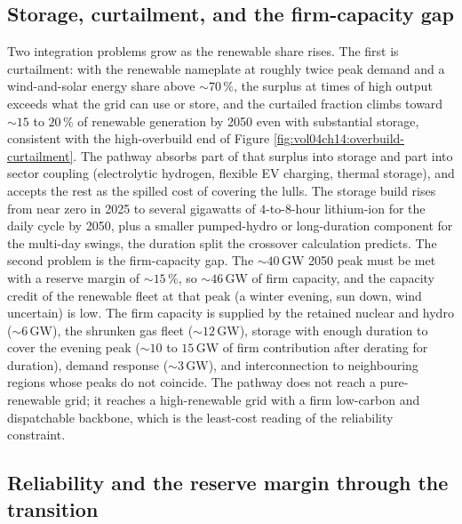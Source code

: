 \subsection{Storage, curtailment, and the firm-capacity gap}

Two integration problems grow as the renewable share rises. The first is
curtailment: with the renewable nameplate at roughly twice peak demand and
a wind-and-solar energy share above $\sim 70\,\%$, the surplus at times of
high output exceeds what the grid can use or store, and the curtailed
fraction climbs toward $\sim 15$ to $20\,\%$ of renewable generation by
2050 even with substantial storage, consistent with the high-overbuild end
of Figure \ref{fig:vol04ch14:overbuild-curtailment}. The pathway absorbs
part of that surplus into storage and part into sector coupling
(electrolytic hydrogen, flexible EV charging, thermal storage), and accepts
the rest as the spilled cost of covering the lulls. The storage build rises
from near zero in 2025 to several gigawatts of $4$-to-$8$-hour lithium-ion
for the daily cycle by 2050, plus a smaller pumped-hydro or long-duration
component for the multi-day swings, the duration split the crossover
calculation predicts. The second problem is the firm-capacity gap. The
$\sim 40\,\si{\giga\watt}$ 2050 peak must be met with a reserve margin of
$\sim 15\,\%$, so $\sim 46\,\si{\giga\watt}$ of firm capacity, and the
capacity credit of the renewable fleet at that peak (a winter evening,
sun down, wind uncertain) is low. The firm capacity is supplied by the
retained nuclear and hydro ($\sim 6\,\si{\giga\watt}$), the shrunken gas
fleet ($\sim 12\,\si{\giga\watt}$), storage with enough duration to cover
the evening peak ($\sim 10$ to $15\,\si{\giga\watt}$ of firm contribution
after derating for duration), demand response ($\sim 3\,\si{\giga\watt}$),
and interconnection to neighbouring regions whose peaks do not coincide.
The pathway does not reach a pure-renewable grid; it reaches a
high-renewable grid with a firm low-carbon and dispatchable backbone, which
is the least-cost reading of the reliability constraint.

\subsection{Reliability and the reserve margin through the transition}

